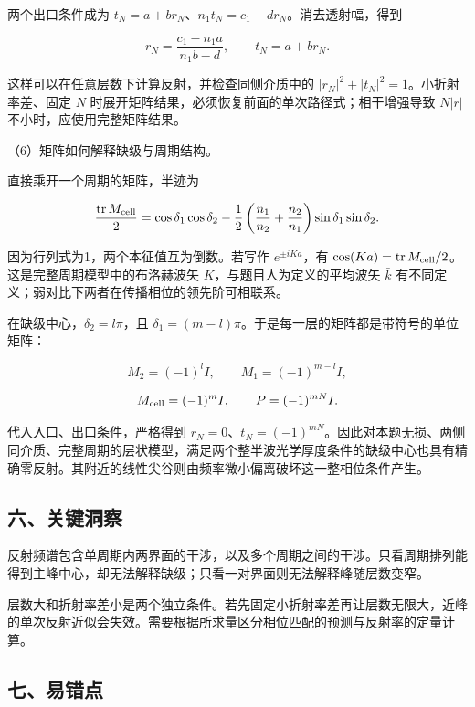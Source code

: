 \documentclass[12pt,a4paper,fontset=fandol]{ctexart}
\begin{document}
两个出口条件成为 \(t_N=a+br_N\)、\(n_1t_N=c_1+dr_N\)。消去透射幅，得到

\[
r_N=\frac{c_1-n_1a}{n_1b-d},\qquad
t_N=a+br_N.
\]

这样可以在任意层数下计算反射，并检查同侧介质中的
\(|r_N|^2+|t_N|^2=1\)。小折射率差、固定 \(N\)
时展开矩阵结果，必须恢复前面的单次路径式；相干增强导致 \(N|r|\)
不小时，应使用完整矩阵结果。

（6）矩阵如何解释缺级与周期结构。

直接乘开一个周期的矩阵，半迹为

\[
\frac{\operatorname{tr}M_{\rm cell}}2
=\cos\delta_1\cos\delta_2
-\frac12\left(\frac{n_1}{n_2}+\frac{n_2}{n_1}\right)
\sin\delta_1\sin\delta_2.
\]

因为行列式为1，两个本征值互为倒数。若写作 \(e^{\pm iKa}\)，有
\(\cos(Ka)=\operatorname{tr}M_{\rm cell}/2\)。这是完整周期模型中的布洛赫波矢
\(K\)，与题目人为定义的平均波矢 \(\bar k\)
有不同定义；弱对比下两者在传播相位的领先阶可相联系。

在缺级中心，\(\delta_2=l\pi\)，且
\(\delta_1=(m-l)\pi\)。于是每一层的矩阵都是带符号的单位矩阵：

\[
M_2=(-1)^lI,\qquad M_1=(-1)^{m-l}I,
\]

\[
M_{\rm cell}=(-1)^mI,\qquad P=(-1)^{mN}I.
\]

代入入口、出口条件，严格得到
\(r_N=0\)、\(t_N=(-1)^{mN}\)。因此对本题无损、两侧同介质、完整周期的层状模型，满足两个整半波光学厚度条件的缺级中心也具有精确零反射。其附近的线性尖谷则由频率微小偏离破坏这一整相位条件产生。

\subsection{六、关键洞察}\label{ux516dux5173ux952eux6d1eux5bdf-6}

反射频谱包含单周期内两界面的干涉，以及多个周期之间的干涉。只看周期排列能得到主峰中心，却无法解释缺级；只看一对界面则无法解释峰随层数变窄。

层数大和折射率差小是两个独立条件。若先固定小折射率差再让层数无限大，近峰的单次反射近似会失效。需要根据所求量区分相位匹配的预测与反射率的定量计算。

\subsection{七、易错点}\label{ux4e03ux6613ux9519ux70b9-6}
\end{document}
